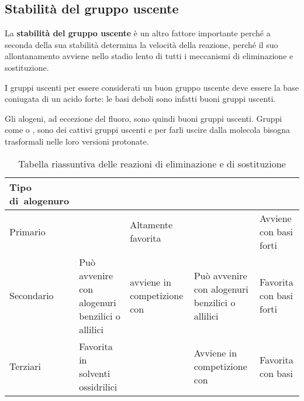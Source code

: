 
\subsection*{Stabilità del gruppo uscente}
La \textbf{stabilità del gruppo uscente} è un altro fattore importante perché a seconda della sua stabilità determina la velocità della reazione, perché il suo allontanamento avviene nello stadio lento di tutti i meccanismi di eliminazione e sostituzione.

I gruppi uscenti per essere considerati un buon gruppo uscente deve essere la base coniugata di un acido forte: le basi deboli sono infatti buoni gruppi uscenti.

Gli alogeni, ad eccezione del fluoro, sono quindi buoni gruppi uscenti. Gruppi come  o , sono dei cattivi gruppi uscenti e per farli uscire dalla molecola bisogna trasformali nelle loro versioni protonate.

\begin{table}[H]
	\centering
	\renewcommand{\arraystretch}{2}
	\begin{tabularx}{\textwidth}{X X X X X}
		\toprule
		Tipo \mbox{di alogenuro} & \multicolumn{1}{c}{\mech[1]}                    & \multicolumn{1}{c}{\mech[2]}         & \multicolumn{1}{c}{\mech[e1]}                   & \multicolumn{1}{c}{\mech[e2]} \\
		\midrule
		Primario                 &                                                 & Altamente \mbox{favorita}             &                                                 & Avviene con basi forti        \\
		Secondario               & Può avvenire con alogenuri benzilici o allilici & avviene in competizione con \mech[e2] & Può avvenire con alogenuri benzilici o allilici & Favorita con basi forti       \\
		Terziari                 & Favorita in solventi ossidrilici                &                                       & Avviene in competizione con \mech[1]            & Favorita con basi             \\
		\bottomrule
	\end{tabularx}
	\caption{Tabella riassuntiva delle reazioni di eliminazione e di sostituzione}
\end{table}